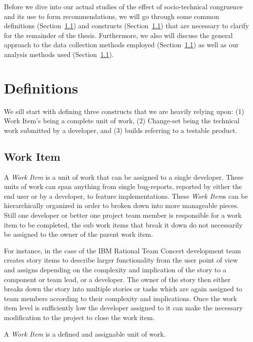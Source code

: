 Before we dive into our actual studies of the effect of socio-technical congruence and its use to form recommendations, we will go through some common definitions (Section~\ref{}) and constructs (Section~\ref{}) that are necessary to clarify for the remainder of the thesis.
Furthermore, we also will discuss the general approach to the data collection methods employed (Section~\ref{}) as well as our analysis methods used (Section~\ref{}).

\section{Definitions}
We sill start with defining three constructs that we are heavily relying upon: (1) Work Item's being a complete unit of work, (2) Change-set being the technical work submitted by a developer, and (3) builds referring to a testable product.

\subsection{Work Item}
A \emph{Work Item} is a unit of work that can be assigned to a single developer.
These units of work can span anything from single bug-reports, reported by either the end user or by a developer, to feature implementations.
These \emph{Work Item}s can be hierarchically organized in order to broken down into more manageable pieces.
Still one developer or better one project team member is responsible for a work item to be completed, the sub work items that break it down do not necessarily be assigned to the owner of the parent work item.

For instance, in the case of the IBM Rational Team Concert development team creates story items to describe larger functionality from the user point of view and assigns depending on the complexity and implication of the story to a component or team lead, or a developer.
The owner of the story then either breaks down the story into multiple stories or tasks which are again assigned to team members according to their complexity and implications.
Once the work item level is sufficiently low the developer assigned to it can make the necessary modification to the project to close the work item.

\begin{note}
\begin{mydef}
A \emph{Work Item} is a defined and assignable unit of work.
\end{mydef}
\end{note} 

